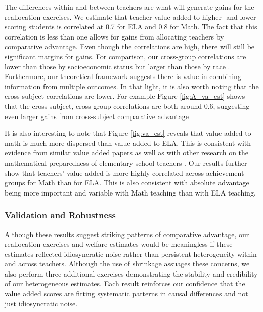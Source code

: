 \documentclass[12pt]{article}
\theoremstyle{definition}
\theoremstyle{definition}
\theoremstyle{definition}
\theoremstyle{definition}
\begin{document}
The differences within and between teachers are what will generate gains for the reallocation exercises. We estimate that teacher value added to higher- and lower-scoring students is correlated at 0.7 for ELA and 0.8 for Math. The fact that this correlation is less than one allows for gains from allocating teachers by comparative advantage. Even though the correlations are high, there will still be significant margins for gains. For comparison, our cross-group correlations are lower than those by socioeconomic status \citep [0.9 for math in][]{bates2022teacher} but larger than those by race \citep[0.7 for math and 0.4 for ELA in][]{Delgado2020}. Furthermore, our theoretical framework suggests there is value in combining information from multiple outcomes. In that light, it is also worth noting that the cross-subject correlations are lower. For example Figure \ref{fig:A_va_est} shows that the cross-subject, cross-group correlations are both around 0.6, suggesting even larger gains from cross-subject comparative advantage

It is also interesting to note that Figure \ref{fig:va_est} reveals that value added to math is much more dispersed than value added to ELA. This is consistent with evidence from similar value added papers \citep[e.g.,][]{chetty2014measuring1} as well as with other research on the mathematical preparedness of elementary school teachers \citep{?,?,?}. Our results further show that teachers' value added is more highly correlated across achievement groups for Math than for ELA. This is also consistent with absolute advantage being more important and variable with Math teaching than with ELA teaching.



\subsubsection{Validation and Robustness}
Although these results suggest striking patterns of comparative advantage, our reallocation exercises and welfare estimates would be meaningless if these estimates reflected idiosyncratic noise rather than persistent heterogeneity within and across teachers. Although the use of shrinkage assuages these concerns, we also perform three additional exercises demonstrating the stability and credibility of our heterogeneous estimates. Each result reinforces our confidence that the value added scores are fitting systematic patterns in causal differences and not just idiosyncratic noise.
\end{document}
